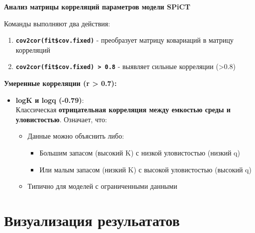 \documentclass[
  letterpaper,
  DIV=11,
  numbers=noendperiod]{scrreprt}
\begin{document}
\textbf{Анализ матрицы корреляций параметров модели SPiCT}

Команды выполняют два действия:

\begin{enumerate}
\def\labelenumi{\arabic{enumi}.}
\item
  \textbf{\texttt{cov2cor(fit\$cov.fixed)}} - преобразует матрицу
  ковариаций в матрицу корреляций
\item
  \textbf{\texttt{cov2cor(fit\$cov.fixed)\ \textgreater{}\ 0.8}} -
  выявляет сильные корреляции (\textgreater0.8)
\end{enumerate}

\textbf{Умеренные корреляции (\textbar r\textbar{} \textgreater{} 0.7):}

\begin{itemize}
\item
  \textbf{logK и logq (-0.79)}:\\
  Классическая \textbf{отрицательная корреляция между емкостью среды и
  уловистостью}. Означает, что:

  \begin{itemize}
  \item
    Данные можно объяснить либо:

    \begin{itemize}
    \item
      Большим запасом (высокий K) с низкой уловистостью (низкий q)
    \item
      Или малым запасом (низкий K) с высокой уловистостью (высокий q)
    \end{itemize}
  \item
    Типично для моделей с ограниченными данными
  \end{itemize}
\end{itemize}

\section{Визуализация
резульататов}\label{ux432ux438ux437ux443ux430ux43bux438ux437ux430ux446ux438ux44f-ux440ux435ux437ux443ux43bux44cux430ux442ux430ux442ux43eux432}
\end{document}
